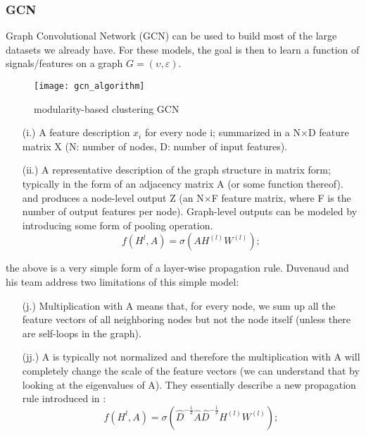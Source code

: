 \subsubsection{GCN}
Graph Convolutional Network (GCN) can be used to build most of the large datasets we already have. For these models, the goal is then to learn a function of signals/features on a graph $ G=(\upsilon ,\varepsilon ) $.\\

\begin{figure}[h]
\caption{modularity-based clustering GCN}
\label{figure:2-2}
\centering
\texttt{[image: gcn\_algorithm]}
\end{figure}

\begin{itemize}
\item[(i.)] A feature description $x_{i}$ for every node i; summarized in a N$\times$D feature matrix X (N: number of nodes, D: number of input features).
\item[(ii.)] A representative description of the graph structure in matrix form; typically in the form of an adjacency matrix A (or some function thereof).
and produces a node-level output Z (an N$\times$F feature matrix, where F is the number of output features per node). Graph-level outputs can be modeled by introducing some form of pooling operation. \cite{duvenaud2015convolutional}
\[
f(H^{l},A) = \sigma (AH^{(l)}W^{(l)});
\]
\end{itemize}
the above is a very simple form of a layer-wise propagation rule. Duvenaud and his team \cite{duvenaud2015convolutional} address two limitations of this simple model: 
\begin{itemize}
\item[(j.)] Multiplication with A means that, for every node, we sum up all the feature vectors of all neighboring nodes but not the node itself (unless there are self-loops in the graph).
\item[(jj.)] A  is typically not normalized and therefore the multiplication with A will completely change the scale of the feature vectors (we can understand that by looking at the eigenvalues of A).
They essentially describe a new propagation rule introduced in \cite{kipf2016semi}:
\[
f(H^{l},A) = \sigma (\hat{D}^{-\frac{1}{2}} \hat{A}\hat{D}^{-\frac{1}{2}}H^{ (l) }W^{ (l) }) ;
\]
\end{itemize}

